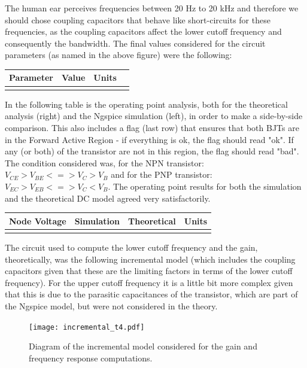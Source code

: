 The human ear perceives frequencies between 20 Hz to 20 kHz and therefore we should chose coupling capacitors that behave like short-circuits for these frequencies, as the coupling capacitors affect the lower cutoff frequency and consequently the bandwidth. The final values considered for the circuit parameters (as named in the above figure) were the following:

\hfill
 \parbox{1\linewidth}{
  \centering
  \begin{tabular}{|l|l|l|r|}
    \hline    
    {\bf Parameter} & {\bf Value} & {\bf Units }\\ \hline
    
  \label{tab:params}
  \end{tabular}
  }
\par

In the following table is the operating point analysis, both for the theoretical analysis (right) and the Ngspice simulation (left), in order to make a side-by-side comparison. This also includes a flag (last row) that ensures that both BJTs are in the Forward Active Region - if everything is ok, the flag should read "ok". If any (or both) of the transistor are not in this region, the flag should read "bad". The condition considered was, for the NPN transistor: $V_{CE} > V_{BE} <=> V_{C} > V_{B}$ and for the PNP transistor: $V_{EC} > V_{EB} <=> V_{C} < V_{B}$. The operating point results for both the simulation and the theoretical DC model agreed very satisfactorily. \par

\hfill
 \parbox{1\linewidth}{
  \centering
  \begin{tabular}{|l|l|l|r|}
    \hline    
    {\bf Node Voltage} & {\bf Simulation} & {\bf Theoretical } & {\bf Units }\\ \hline
    
  \label{tab:op_FAR}
  \end{tabular}
  }
\par
The circuit used to compute the lower cutoff frequency and the gain, theoretically, was the following incremental model (which includes the coupling capacitors given that these are the limiting factors in terms of the lower cutoff frequency). For the upper cutoff frequency it is a little bit more complex given that this is due to the parasitic capacitances of the transistor, which are part of the Ngspice model, but were not considered in the theory.\par 

\begin{figure}[h] \centering
\texttt{[image: incremental\_t4.pdf]}
\vspace{-7cm}
\caption{Diagram of the incremental model considered for the gain and frequency response computations.}
\label{fig:diagram_t4}
\end{figure}
\par
\vspace{1cm}


